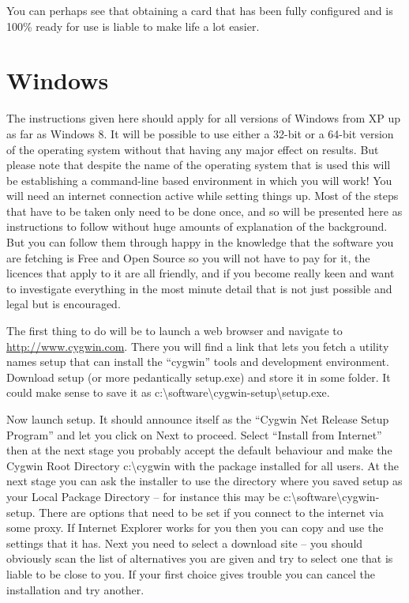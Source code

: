 You can perhaps see that obtaining a card that has been fully configured
and is 100\% ready for use is liable to make life a lot easier.

\section{Windows}
The instructions given here should apply for all versions of Windows
from XP up as far as Windows 8. It will be possible to use either
a 32-bit or a 64-bit version of the operating system without that having
any major effect on results. But please note that despite the name of
the operating system that is used this will be establishing a command-line
based environment in which you will work! You will need an internet connection
active while setting things up. Most of the steps that have to be taken
only need to be done once, and so will be presented here as
instructions to follow without huge amounts of explanation of the
background. But you can follow them through happy in the knowledge that the
software you are fetching is Free and Open Source so you will not have
to pay for it, the licences that apply to it are all friendly, and if you
become really keen and want to investigate everything in the most
minute detail that is not just possible and legal but is encouraged.

The first thing to do will be to launch a web browser and navigate to
\url{http://www.cygwin.com}. There you will find a link that lets you
fetch a utility names {\tx setup} that can install the ``cygwin''
tools and development environment. Download {\tx setup} (or more
pedantically {\tx setup.exe}) and store it in some folder. It could make
sense to save it as {\tx c:{\textbackslash}software{\textbackslash}cygwin-setup{\textbackslash}setup.exe}.

Now launch {\tx setup}. It should announce itself as the ``Cygwin Net
Release Setup Program'' and let you click on {\tx Next} to proceed.
Select ``Install from Internet'' then at the next stage you probably accept
the default behaviour and make the Cygwin Root Directory {\tx c:{\textbackslash}cygwin}
with the package installed for all users. At the next stage you can ask the
installer to use the directory where you saved {\tx setup} as your
Local Package Directory -- for instance this may be
{\tx c:{\textbackslash}software{\textbackslash}cygwin-setup}. There are options that need to be set if you
connect to the internet via some proxy. If Internet Explorer works for you
then you can copy and use the settings that it has.
Next you need to select a download site -- you should obviously scan the list
of alternatives you are given and try to select one that is liable to be
close to you. If your first choice gives trouble you can cancel the
installation and try another.

